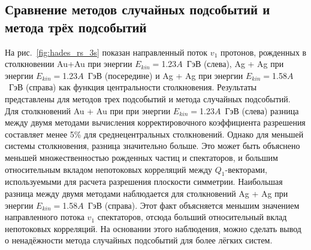 \subsection{Сравнение методов случайных подсобытий и метода трёх подсобытий}

На рис.~\ref{fig:hades_rs_3s} показан направленный поток $v_1$ протонов, рожденных в столкновении Au+Au при энергии $E_{kin}=$1.23$A$~ГэВ (слева), Ag + Ag при энергии $E_{kin}=$1.23$A$~ГэВ (посередине) и Ag + Ag при энергии $E_{kin}=$1.58$A$~ГэВ (справа) как функция центральности столкновения. 
Результаты представлены для методов трех подсобытий и метода случайных подсобытий.
Для столкновений Au + Au при при энергии $E_{kin}=$1.23$A$~ГэВ (слева) разница между двумя методами вычисления корректировочного коэффициента разрешения составляет менее 5\% для среднецентральных столкновений.
Однако для меньшей системы столкновения, разница значительно больше. 
Это может быть объяснено меньшей множественностью рожденных частиц и спектаторов, и большим относительным вкладом непотоковых корреляций между $Q_1$-векторами, используемыми для расчета разрешения плоскости симметрии.
Наибольшая разница между двумя методами наблюдается для столкновений Ag + Ag при энергии $E_{kin}=$1.58$A$~ГэВ (справа).
Этот факт объясняется меньшим значением направленного потока $v_1$ спектаторов, отсюда больший относительный вклад непотоковых корреляций.
На основании этого наблюдения, можно сделать вывод о ненадёжности метода случайных подсобытий для более лёгких систем.
%
